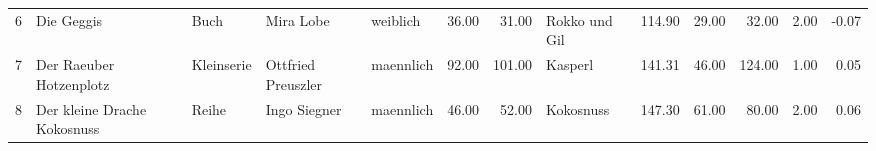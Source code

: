 \begin{sidewaystable}[ht]
\begin{center}
{\begin{tabular}{rllllrrlrrrrr}
  6 & Die Geggis                                                                                                                                                                                                                                                      & Buch & Mira Lobe                                                                                                                                                                                                                                                       & weiblich & 36.00 & 31.00 & Rokko und Gil                                                                                                                                                                                                                                                   & 114.90 & 29.00 & 32.00 & 2.00 & -0.07 \\ 
  7 & Der Raeuber Hotzenplotz                                                                                                                                                                                                                                         & Kleinserie & Ottfried Preuszler                                                                                                                                                                                                                                              & maennlich & 92.00 & 101.00 & Kasperl                                                                                                                                                                                                                                                         & 141.31 & 46.00 & 124.00 & 1.00 & 0.05 \\ 
  8 & Der kleine Drache Kokosnuss                                                                                                                                                                                                                                     & Reihe & Ingo Siegner                                                                                                                                                                                                                                                    & maennlich & 46.00 & 52.00 & Kokosnuss                                                                                                                                                                                                                                                       & 147.30 & 61.00 & 80.00 & 2.00 & 0.06 \\ 

\end{tabular}}
\end{center}
\end{sidewaystable}
